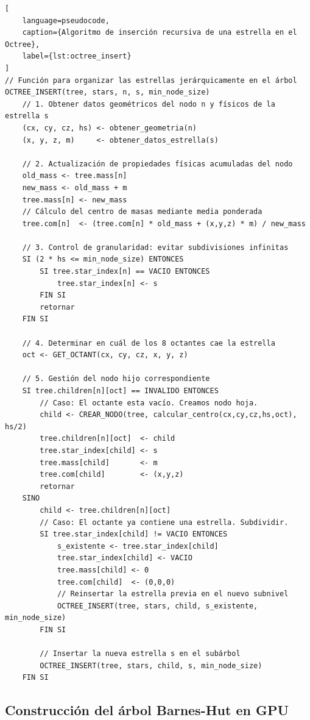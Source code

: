 \begin{lstlisting}[
    language=pseudocode,
    caption={Algoritmo de inserción recursiva de una estrella en el Octree},
    label={lst:octree_insert}
]
// Función para organizar las estrellas jerárquicamente en el árbol
OCTREE_INSERT(tree, stars, n, s, min_node_size)
    // 1. Obtener datos geométricos del nodo n y físicos de la estrella s
    (cx, cy, cz, hs) <- obtener_geometria(n)
    (x, y, z, m)     <- obtener_datos_estrella(s)

    // 2. Actualización de propiedades físicas acumuladas del nodo
    old_mass <- tree.mass[n]
    new_mass <- old_mass + m
    tree.mass[n] <- new_mass
    // Cálculo del centro de masas mediante media ponderada
    tree.com[n]  <- (tree.com[n] * old_mass + (x,y,z) * m) / new_mass

    // 3. Control de granularidad: evitar subdivisiones infinitas
    SI (2 * hs <= min_node_size) ENTONCES
        SI tree.star_index[n] == VACIO ENTONCES
            tree.star_index[n] <- s
        FIN SI
        retornar
    FIN SI

    // 4. Determinar en cuál de los 8 octantes cae la estrella
    oct <- GET_OCTANT(cx, cy, cz, x, y, z)

    // 5. Gestión del nodo hijo correspondiente
    SI tree.children[n][oct] == INVALIDO ENTONCES
        // Caso: El octante esta vacío. Creamos nodo hoja.
        child <- CREAR_NODO(tree, calcular_centro(cx,cy,cz,hs,oct), hs/2)
        tree.children[n][oct]  <- child
        tree.star_index[child] <- s
        tree.mass[child]       <- m
        tree.com[child]        <- (x,y,z)
        retornar
    SINO
        child <- tree.children[n][oct]
        // Caso: El octante ya contiene una estrella. Subdividir.
        SI tree.star_index[child] != VACIO ENTONCES
            s_existente <- tree.star_index[child]
            tree.star_index[child] <- VACIO
            tree.mass[child] <- 0
            tree.com[child]  <- (0,0,0)
            // Reinsertar la estrella previa en el nuevo subnivel
            OCTREE_INSERT(tree, stars, child, s_existente, min_node_size)
        FIN SI

        // Insertar la nueva estrella s en el subárbol
        OCTREE_INSERT(tree, stars, child, s, min_node_size)
    FIN SI
\end{lstlisting}

\subsection{Construcción del árbol Barnes-Hut en GPU}\label{subsec:construccion-del-arbol-barnes-hut-en-gpu}


